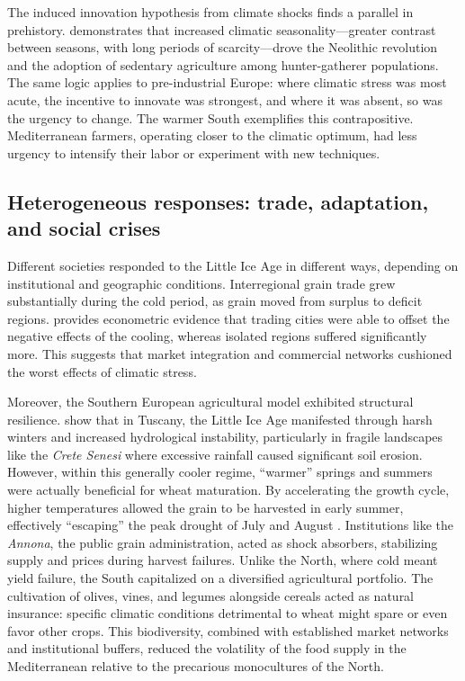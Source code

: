 \documentclass[11pt,a4paper]{article}
\begin{document}
The induced innovation hypothesis from climate shocks finds a parallel in 
prehistory. \textcite{Matranga2024} demonstrates that increased climatic 
seasonality---greater contrast between seasons, with long periods of 
scarcity---drove the Neolithic revolution and the adoption of sedentary 
agriculture among hunter-gatherer populations. The same logic applies to 
pre-industrial Europe: where climatic stress was most acute, the incentive
to innovate was strongest, and where it was absent, so was the urgency
to change.
The warmer South exemplifies this contrapositive. Mediterranean farmers, operating closer to the climatic optimum, had less urgency to intensify their labor or experiment with new techniques.
\subsection*{Heterogeneous responses: trade, adaptation, and social crises}
Different societies responded to the Little Ice Age in different ways, depending on institutional and geographic conditions.
Interregional grain trade grew substantially during the cold period, as grain moved from surplus to deficit regions. \textcite{Waldinger2022} provides econometric evidence that trading cities were able to offset the negative effects of the cooling, whereas isolated regions suffered significantly more. This suggests that market integration and commercial networks cushioned the worst effects of climatic stress.

Moreover, the Southern European agricultural model exhibited structural resilience. \textcite{OddoErdkamp2025} show that in Tuscany, the Little Ice Age manifested through harsh winters and increased hydrological instability, particularly in fragile landscapes like the \textit{Crete Senesi} where excessive rainfall caused significant soil erosion. However, within this generally cooler regime, ``warmer'' springs and summers were actually beneficial for wheat maturation. By accelerating the growth cycle, higher temperatures allowed the grain to be harvested in early summer, effectively ``escaping'' the peak drought of July and August \parencite{OddoErdkamp2025}. Institutions like the \textit{Annona}, the public grain administration, acted as shock absorbers, stabilizing supply and prices during harvest failures. Unlike the North, where cold meant yield failure, the South capitalized on a diversified agricultural portfolio. The cultivation of olives, vines, and legumes alongside cereals acted as natural insurance: specific climatic conditions detrimental to wheat might spare or even favor other crops. This biodiversity, combined with established market networks and institutional buffers, reduced the volatility of the food supply in the Mediterranean relative to the precarious monocultures of the North.
\end{document}
